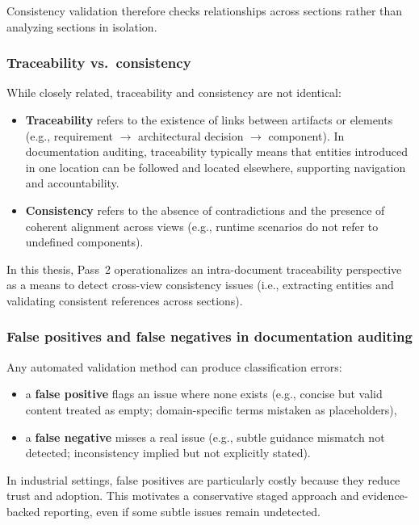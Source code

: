 Consistency validation therefore checks relationships across sections rather than analyzing sections in isolation.

\subsubsection{Traceability vs.\ consistency}
While closely related, traceability and consistency are not identical:
\begin{itemize}
    \item \textbf{Traceability} refers to the existence of links between artifacts or elements (e.g., requirement $\rightarrow$ architectural decision $\rightarrow$ component). In documentation auditing, traceability typically means that entities introduced in one location can be followed and located elsewhere, supporting navigation and accountability.
    \item \textbf{Consistency} refers to the absence of contradictions and the presence of coherent alignment across views (e.g., runtime scenarios do not refer to undefined components).
\end{itemize}

In this thesis, Pass~2 operationalizes an intra-document traceability perspective as a means to detect cross-view consistency issues (i.e., extracting entities and validating consistent references across sections).

\subsubsection{False positives and false negatives in documentation auditing}
Any automated validation method can produce classification errors:
\begin{itemize}
    \item a \textbf{false positive} flags an issue where none exists (e.g., concise but valid content treated as empty; domain-specific terms mistaken as placeholders),
    \item a \textbf{false negative} misses a real issue (e.g., subtle guidance mismatch not detected; inconsistency implied but not explicitly stated).
\end{itemize}

In industrial settings, false positives are particularly costly because they reduce trust and adoption. This motivates a conservative staged approach and evidence-backed reporting, even if some subtle issues remain undetected.

